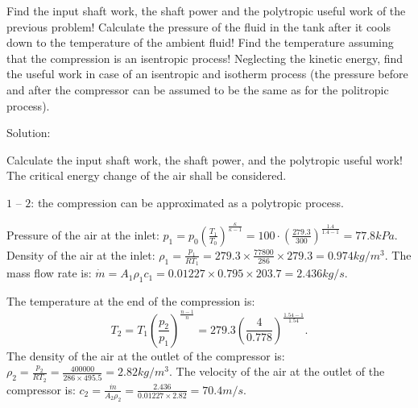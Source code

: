 \vspace{1cm}
\begin{tcolorbox}[breakable]

Find the input shaft work, the shaft power and the polytropic useful work of the previous problem! Calculate the pressure of the fluid in the tank after it cools down to the temperature of the
ambient fluid! Find the temperature assuming that the compression is an isentropic process! Neglecting the kinetic energy, find the useful work in case of an isentropic and isotherm process (the pressure
before and after the compressor can be assumed to be the same as for the politropic process).
\vspace{0.2cm}

Solution:
\vspace{0.2cm}

Calculate the input shaft work, the shaft power, and the polytropic useful work! The critical energy change of the air shall be considered.
\vspace{0.1cm}

$1$ – $2$: the compression can be approximated as a polytropic process.


Pressure of the air at the inlet: $p_1=p_0\left(\frac{T_1}{T_0}\right)^{\frac{\kappa}{\kappa-1}}=100 \cdot\left(\frac{279.3}{300}\right)^{\frac{1.4}{1.4-1}}=77.8 kPa$.
Density of the air at the inlet: $\rho_1=\frac{p_1}{RT_1}=279.3 \times \frac{77800}{286} \times 279.3=0.974 kg/m^3$.
The mass flow rate is: $\dot m=A_1\rho_1c_1=0.01227 \times 0.795 \times 203.7=2.436 kg/s$.


The temperature at the end of the compression is:
\begin{equation*}
	T_2=T_1\left(\frac{p_2}{p_1}\right)^{\frac{n-1}{n}}=279.3\left(\frac{4}{0.778}\right)^{\frac{1.54-1}{1.54}}.
\end{equation*}
The density of the air at the outlet of the compressor is: $\rho_2=\frac{p_2}{RT_2}=\frac{400000}{286 \times 495.5}=2.82 kg/m^3$.
The velocity of the air at the outlet of the compressor is: $c_2=\frac{\dot m}{A_2\rho_2}=\frac{2.436}{0.01227 \times 2.82}=70.4 m/s$.



\end{tcolorbox}
